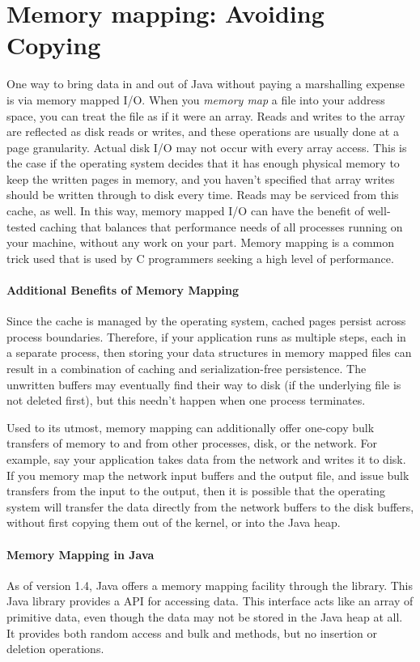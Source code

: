 \section{Memory mapping: Avoiding Copying}
\label{sec:memory-mapping}

One way to bring data in and out of Java without paying a marshalling expense is
via memory mapped I/O. When you \emph{memory map} a file into your address
space, you can treat the file as if it were an array. Reads and writes to the
array are reflected as disk reads or writes, and these operations are usually
done at a page granularity. Actual disk I/O may not occur with every array
access. This is the case if the operating system decides that it has enough
physical memory to keep the written pages in memory, and you haven't specified
that array writes should be written through to disk every time. Reads may be
serviced from this cache, as well. In this way, memory mapped I/O can have the
benefit of well-tested caching that balances that performance needs of all
processes running on your machine, without any work on your part.  Memory
mapping is a common trick used that is used by C programmers seeking a high
level of performance.

\paragraph{Additional Benefits of Memory Mapping}
Since the cache is managed by the operating system, cached pages persist across
process boundaries. Therefore, if your application runs as multiple steps, each
in a separate process, then storing your data structures in memory mapped files
can result in a combination of caching and serialization-free persistence. The
unwritten buffers may eventually find their way to disk (if the underlying file
is not deleted first), but this needn't happen when one process terminates.

Used to its utmost, memory mapping can additionally offer one-copy bulk
transfers of memory to and from other processes, disk, or the network. For
example, say your application takes data from the network and writes it to
disk. If you memory map the network input buffers and the output file, and issue
bulk transfers from the input to the output, then it is possible that the
operating system will transfer the data directly from the network buffers to the
disk buffers, without first copying them out of the kernel, or into the
Java heap.

\paragraph{Memory Mapping in Java}
As of version 1.4, Java offers a memory mapping facility through the
 library. This Java library provides a  API for
accessing data. This interface acts like an array of primitive data, even though
the data may not be stored in the Java heap at all. It provides both random
access and bulk  and  methods, but no insertion or deletion
operations.

